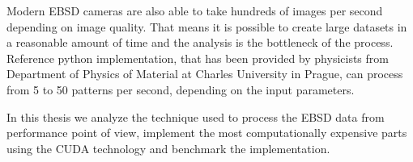 Modern EBSD cameras are also able to take hundreds of images per second depending on image quality. That means it is possible to create large datasets in a reasonable amount of time and the analysis is the bottleneck of the process. Reference python implementation, that has been provided by physicists from Department of Physics of Material at Charles University in Prague, can process from 5 to 50 patterns per second, depending on the input parameters.

In this thesis we analyze the technique used to process the EBSD data from performance point of view, implement the most computationally expensive parts using the CUDA technology and benchmark the implementation.


